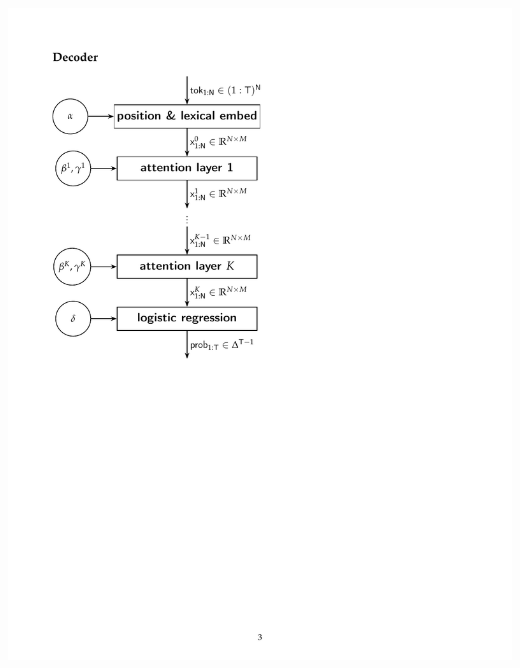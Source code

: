\documentclass[9pt]{report}
\begin{document}
{\vspace*{-2.5in}
\vspace*{-2.5in}
\hfill\includegraphics[height=\textheight]{img/transformer-diagram.pdf}

}
\end{document}
